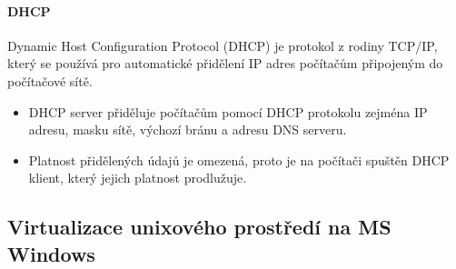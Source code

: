 \paragraph{DHCP}
Dynamic Host Configuration Protocol (DHCP) je protokol z rodiny TCP/IP, který se používá pro automatické přidělení IP adres počítačům připojeným do počítačové sítě.

\begin{itemize}
    \item DHCP server přiděluje počítačům pomocí DHCP protokolu zejména IP adresu, masku sítě, výchozí bránu a adresu DNS serveru.
    \item Platnost přidělených údajů je omezená, proto je na počítači spuštěn DHCP klient, který jejich platnost prodlužuje.
\end{itemize}

\subsection{Virtualizace unixového prostředí na MS Windows}